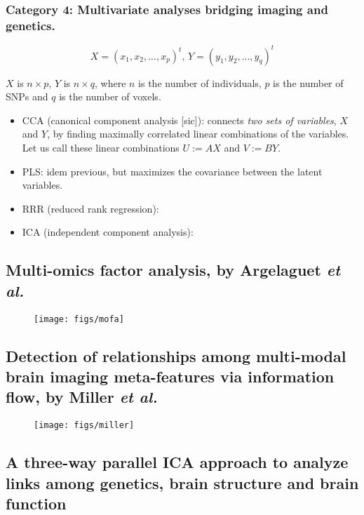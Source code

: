 \documentclass[9pt]{article}
\begin{document}
\subsubsection{Category 4: Multivariate analyses bridging imaging and genetics.}

\begin{equation}
X=(x_1, x_2, ..., x_p)^t,\, Y=(y_1, y_2, ..., y_q)^t
\end{equation}

$X$ is $n\times p$, $Y$ is $n\times q$, where $n$ is the number of individuals, $p$ is the number of SNPs and $q$ is the number of voxels.	
\begin{itemize}
\item CCA (canonical component analysis [sic]): connects \emph{two sets of variables}, $X$ and $Y$, by finding maximally correlated linear combinations of the variables. Let us call these linear combinations $U:=AX$ and $V:=BY$.
\item PLS: idem previous, but maximizes the covariance between the latent variables.
\item RRR (reduced rank regression):
\item ICA (independent component analysis):
\end{itemize}


\subsection{Multi-omics factor analysis, by Argelaguet \emph{et al.}}

\begin{figure}[h!]
  \texttt{[image: figs/mofa]}
  \label{fig:mofa}
\end{figure}


\subsection{Detection of relationships among multi-modal brain imaging
meta-features via information flow, by Miller \emph{et al.}}

\begin{figure}[h!]
  \texttt{[image: figs/miller]}
  \label{fig:cond_prob}
\end{figure}


\subsection{A three-way parallel ICA approach to analyze links among genetics, brain structure and brain function}
\end{document}
